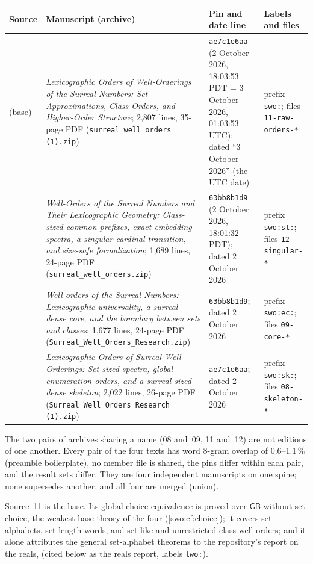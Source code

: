 \documentclass[11pt]{article}
\theoremstyle{definition}
\theoremstyle{remark}
\newcommand{\GB}{\mathsf{GB}}
\newcommand{\code}[1]{\texttt{\small #1}}
\begin{document}
\begingroup\small
\begin{longtable}{@{}>{\raggedright\arraybackslash}p{}>{\raggedright\arraybackslash}p{}>{\raggedright\arraybackslash}p{}>{\raggedright\arraybackslash}p{}@{}}
\toprule
Source & Manuscript (archive) & Pin and date line & Labels and files\\
\midrule\endhead
11 (base) & \emph{Lexicographic Orders of Well-Orderings of the Surreal Numbers:
Set Approximations, Class Orders, and Higher-Order Structure}; 2,807 lines,
35-page PDF (\code{surreal\_well\_orders (1).zip}) &
\code{ae7c1e6aa} (2 October 2026, 18:03:53 PDT = 3 October 2026, 01:03:53
UTC); dated ``3 October 2026'' (the UTC date) &
prefix \code{swo:}; files \code{11-raw-orders-*}\\[3pt]
12 & \emph{Well-Orders of the Surreal Numbers and Their Lexicographic
Geometry: Class-sized common prefixes, exact embedding spectra, a
singular-cardinal transition, and size-safe formalization}; 1,689 lines,
24-page PDF (\code{surreal\_well\_orders.zip}) &
\code{63bb8b1d9} (2 October 2026, 18:01:32 PDT); dated 2 October 2026 &
prefix \code{swo:st:}; files \code{12-singular-*}\\[3pt]
09 & \emph{Well-orders of the Surreal Numbers: Lexicographic universality, a
surreal dense core, and the boundary between sets and classes}; 1,677 lines,
24-page PDF (\code{Surreal\_Well\_Orders\_Research.zip}) &
\code{63bb8b1d9}; dated 2 October 2026 &
prefix \code{swo:ec:}; files \code{09-core-*}\\[3pt]
08 & \emph{Lexicographic Orders of Surreal Well-Orderings: Set-sized spectra,
global enumeration orders, and a surreal-sized dense skeleton}; 2,022 lines,
26-page PDF (\code{Surreal\_Well\_Orders\_Research (1).zip}) &
\code{ae7c1e6aa}; dated 2 October 2026 &
prefix \code{swo:sk:}; files \code{08-skeleton-*}\\
\bottomrule
\end{longtable}
\endgroup

The two pairs of archives sharing a name (08 and~09, 11 and~12) are not
editions of one another. Every pair of the four texts has word 8-gram overlap
of 0.6--1.1\,\% (preamble boilerplate), no member file is shared, the pins
differ within each pair, and the result sets differ. They are four
independent manuscripts on one spine; none supersedes another, and all four
are merged (union).

Source~11 is the base. Its global-choice equivalence is proved over $\GB$
without set choice, the weakest base theory of the four
(\cref{swo:cf:choice}); it covers set alphabets, set-length words, and
set-like and unrestricted class well-orders; and it alone attributes the
general set-alphabet theorems to the repository's report on the reals,
(cited below as the reals report, labels \code{lwo:}).
\end{document}
